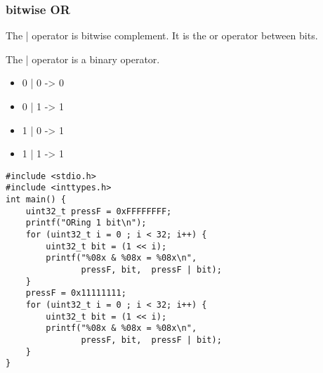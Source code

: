 \documentclass[11pt]{article}
\begin{document}
\subsubsection{bitwise OR}
\label{sec:orgc491b3e}

The | operator is bitwise complement. It is the or operator between
bits. 

The | operator is a binary operator.

\begin{itemize}
\item 0 | 0 -> 0
\item 0 | 1 -> 1
\item 1 | 0 -> 1
\item 1 | 1 -> 1
\end{itemize}

\begin{verbatim}
#include <stdio.h>
#include <inttypes.h>
int main() {  
    uint32_t pressF = 0xFFFFFFFF;
    printf("ORing 1 bit\n");
    for (uint32_t i = 0 ; i < 32; i++) {
        uint32_t bit = (1 << i);
        printf("%08x & %08x = %08x\n",
               pressF, bit,  pressF | bit);
    }
    pressF = 0x11111111;
    for (uint32_t i = 0 ; i < 32; i++) {
        uint32_t bit = (1 << i);
        printf("%08x & %08x = %08x\n",
               pressF, bit,  pressF | bit);
    }
}
\end{verbatim}
\end{document}
